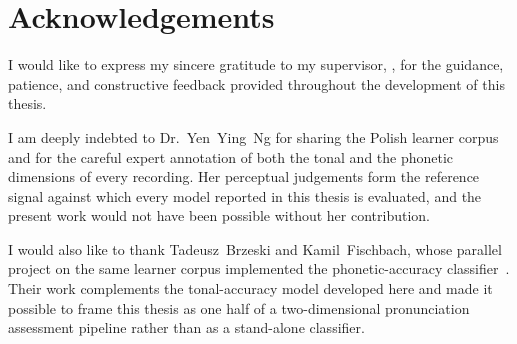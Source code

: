 \chapter*{Acknowledgements}

I would like to express my sincere gratitude to my supervisor,
\thesissupervisor, for the guidance, patience, and constructive feedback
provided throughout the development of this thesis.

I am deeply indebted to Dr.~Yen~Ying~Ng for sharing the Polish learner
corpus and for the careful expert annotation of both the tonal and the
phonetic dimensions of every recording. Her perceptual judgements form the
reference signal against which every model reported in this thesis is
evaluated, and the present work would not have been possible without her
contribution.

I would also like to thank Tadeusz~Brzeski and Kamil~Fischbach, whose
parallel project on the same learner corpus implemented the
phonetic-accuracy classifier~\cite{brzeski2025mprp}. Their work
complements the tonal-accuracy model developed here and made it possible
to frame this thesis as one half of a two-dimensional pronunciation
assessment pipeline rather than as a stand-alone classifier.
